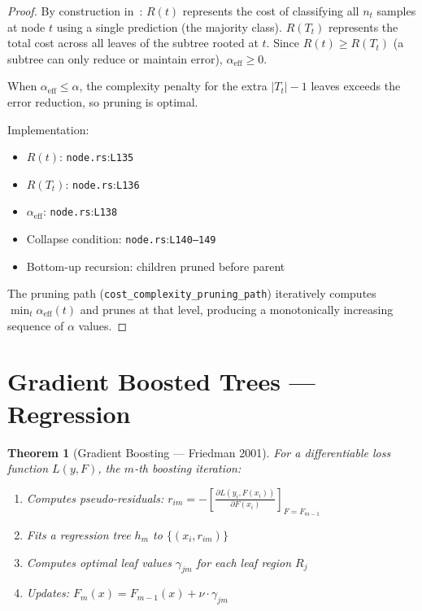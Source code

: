 \documentclass[11pt,a4paper]{article}
\newtheorem{theorem}{Theorem}[section]
\theoremstyle{remark}
\newcommand{\coderef}[2]{\texttt{#1}:\texttt{L#2}}
\begin{document}
\begin{proof}
By construction in~\cite{breiman1984}:
$R(t)$ represents the cost of classifying all $n_t$ samples at node $t$ using
a single prediction (the majority class).  $R(T_t)$ represents the total cost
across all leaves of the subtree rooted at $t$.  Since $R(t) \geq R(T_t)$
(a subtree can only reduce or maintain error), $\alpha_{\text{eff}} \geq 0$.

When $\alpha_{\text{eff}} \leq \alpha$, the complexity penalty for the extra
$|T_t| - 1$ leaves exceeds the error reduction, so pruning is optimal.

Implementation:
\begin{itemize}
  \item $R(t)$: \coderef{node.rs}{135}
  \item $R(T_t)$: \coderef{node.rs}{136}
  \item $\alpha_{\text{eff}}$: \coderef{node.rs}{138}
  \item Collapse condition: \coderef{node.rs}{140--149}
  \item Bottom-up recursion: children pruned before parent
\end{itemize}

The pruning path (\texttt{cost\_complexity\_pruning\_path}) iteratively computes
$\min_t \alpha_{\text{eff}}(t)$ and prunes at that level, producing a monotonically
increasing sequence of $\alpha$ values.
\end{proof}

\section{Gradient Boosted Trees --- Regression}
\label{sec:gbt-reg}

\begin{theorem}[Gradient Boosting --- Friedman 2001]
\label{thm:gbt}
For a differentiable loss function $L(y, F)$, the $m$-th boosting iteration:
\begin{enumerate}[nosep]
  \item Computes pseudo-residuals:
    $r_{im} = -\left[\frac{\partial L(y_i, F(x_i))}{\partial F(x_i)}\right]_{F=F_{m-1}}$
  \item Fits a regression tree $h_m$ to $\{(x_i, r_{im})\}$
  \item Computes optimal leaf values $\gamma_{jm}$ for each leaf region $R_j$
  \item Updates: $F_m(x) = F_{m-1}(x) + \nu \cdot \gamma_{jm}$
\end{enumerate}
\end{theorem}
\end{document}
